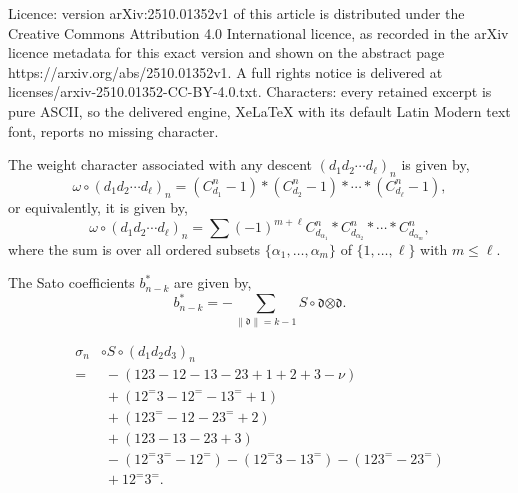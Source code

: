 \documentclass[10pt,a4paper]{amsart}
\newcommand*{\botimes}{\boldsymbol{\otimes}}
\newcommand*{\df}{\mathfrak d}
\begin{document}
Licence: version arXiv:2510.01352v1 of this article is distributed under the Creative Commons Attribution 4.0 International licence, as recorded in the arXiv licence metadata for this exact version and shown on the abstract page https://arxiv.org/abs/2510.01352v1. A full rights notice is delivered at licenses/arxiv-2510.01352-CC-BY-4.0.txt. Characters: every retained excerpt is pure ASCII, so the delivered engine, XeLaTeX with its default Latin Modern text font, reports no missing character.
\begin{theorem}\label{thm:weightformula}
  The weight character associated with any descent $(d_1d_2\cdots d_\ell)_n$ is given by,
  \begin{equation*}
    \omega\circ (d_1d_2\cdots d_\ell)_n=(C^n_{d_1}-1)\ast(C^n_{d_2}-1)\ast\cdots\ast(C^n_{d_\ell}-1),
  \end{equation*}
  or equivalently, it is given by,
  \begin{equation*}  
    \omega\circ (d_1d_2\cdots d_\ell)_n=\sum (-1)^{m+\ell}C_{d_{\alpha_1}}^n\ast C_{d_{\alpha_2}}^n\ast\cdots\ast C_{d_{\alpha_m}}^n,
  \end{equation*}
  where the sum is over all ordered subsets $\{\alpha_1,\ldots,\alpha_m\}$ of $\{1,\ldots,\ell\}$ with $m\leqslant\ell$.
\end{theorem}

\begin{lemma}\label{lemma:Satocoeffsviadescents}
  The Sato coefficients $b^\ast_{n-k}$ are given by,
  \begin{equation*}
    b^\ast_{n-k}=-\sum_{\|\df\|=k-1} S\circ\df\botimes\df.
  \end{equation*}
\end{lemma}

  \begin{align}
    \sigma_n&\circ S\circ (d_1d_2d_3)_n\nonumber\\
           =&\;-(123-12-13-23+1+2+3-\nu)\nonumber\\
            &\;+(12^=3-12^=-13^=+1)\nonumber\\
            &\;+(123^=-12-23^=+2)\nonumber\\
            &\;+(123-13-23+3)\nonumber\\
            &\;-(12^=3^=-12^=)-(12^=3-13^=)-(123^=-23^=)\nonumber\\
            &\;+12^=3^=.\label{eq:siglength3}
  \end{align}
\end{document}
